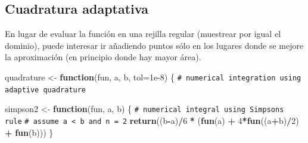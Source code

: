 \documentclass[
  spanish,
  10pt,
]{book}
\newenvironment{Shaded}{\begin{snugshade}}{\end{snugshade}}
\newcommand{\AttributeTok}[1]{\textcolor[rgb]{0.13,0.29,0.53}{#1}}
\newcommand{\CommentTok}[1]{\textcolor[rgb]{0.56,0.35,0.01}{\textit{#1}}}
\newcommand{\ControlFlowTok}[1]{\textcolor[rgb]{0.13,0.29,0.53}{\textbf{#1}}}
\newcommand{\DecValTok}[1]{\textcolor[rgb]{0.00,0.00,0.81}{#1}}
\newcommand{\FloatTok}[1]{\textcolor[rgb]{0.00,0.00,0.81}{#1}}
\newcommand{\FunctionTok}[1]{\textcolor[rgb]{0.13,0.29,0.53}{\textbf{#1}}}
\newcommand{\NormalTok}[1]{#1}
\newcommand{\OtherTok}[1]{\textcolor[rgb]{0.56,0.35,0.01}{#1}}
\newcommand{\SpecialCharTok}[1]{\textcolor[rgb]{0.81,0.36,0.00}{\textbf{#1}}}
\theoremstyle{break}
\theoremstyle{nonumberplain}
\renewcommand{\CommentTok}[1]{\textcolor[rgb]{0.41,0.41,0.41}{\texttt{#1}}}
\begin{document}
\subsection{Cuadratura adaptativa}\label{cuadratura-adaptativa}

En lugar de evaluar la función en una rejilla regular (muestrear por igual el dominio),
puede interesar ir añadiendo puntos sólo en los lugares donde se mejore la aproximación
(en principio donde hay mayor área).

\begin{Shaded}
\begin{Highlighting}[]
\NormalTok{quadrature }\OtherTok{\textless{}{-}} \ControlFlowTok{function}\NormalTok{(fun, a, b, }\AttributeTok{tol=}\FloatTok{1e{-}8}\NormalTok{) \{}
    \CommentTok{\# numerical integration using adaptive quadrature}

\NormalTok{  simpson2 }\OtherTok{\textless{}{-}} \ControlFlowTok{function}\NormalTok{(fun, a, b) \{}
    \CommentTok{\# numerical integral using Simpson\textquotesingle{}s rule}
    \CommentTok{\# assume a \textless{} b and n = 2}
    \FunctionTok{return}\NormalTok{((b}\SpecialCharTok{{-}}\NormalTok{a)}\SpecialCharTok{/}\DecValTok{6} \SpecialCharTok{*}\NormalTok{ (}\FunctionTok{fun}\NormalTok{(a) }\SpecialCharTok{+} \DecValTok{4}\SpecialCharTok{*}\FunctionTok{fun}\NormalTok{((a}\SpecialCharTok{+}\NormalTok{b)}\SpecialCharTok{/}\DecValTok{2}\NormalTok{) }\SpecialCharTok{+} \FunctionTok{fun}\NormalTok{(b)))}
\NormalTok{  \}}
 

\end{Highlighting}
\end{Shaded}
\end{document}
